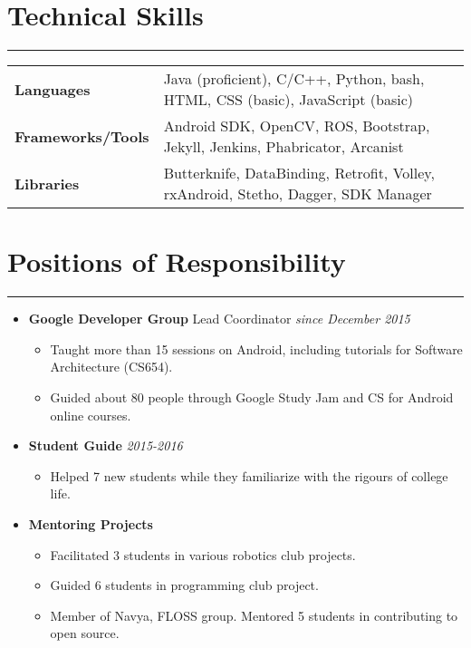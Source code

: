 \documentclass[a4paper]{article}
\begin{document}
\section*{Technical Skills}
\hrule
\vspace{3mm}
\begin{tabular}{@{}m{4.0cm}m{13cm}@{}}
	\textbf{\textrm{Languages}}        & Java (proficient), C/C++, Python, bash, HTML, CSS (basic), JavaScript (basic)      \\ 
	\textbf{\textrm{Frameworks/Tools}} & Android SDK, OpenCV, ROS, Bootstrap, Jekyll, Jenkins, Phabricator, Arcanist        \\
	\textbf{\textrm{Libraries}}        & Butterknife, DataBinding, Retrofit, Volley, rxAndroid, Stetho, Dagger, SDK Manager \\
\end{tabular}

\section*{Positions of Responsibility}
\hrule
\vspace{3mm}
\begin{itemize}
	\item
	      \textbf{Google Developer Group} Lead Coordinator
	      \hfill \textit{since December 2015}
	      \begin{itemize}
	      	\vspace{-2mm} \setlength\itemsep{-0.2em}
		\item Taught more than 15 sessions on Android, including tutorials for Software Architecture (CS654).
		\item Guided about 80 people through Google Study Jam and CS for Android online courses.
	      \end{itemize}
	\item
	      \textbf{Student Guide}
	      \hfill \textit{2015-2016}
	      \begin{itemize}
	      	\vspace{-2mm} \setlength\itemsep{-0.2em}
		\item Helped 7 new students while they familiarize with the rigours of college life.
	      \end{itemize}
	\item
	      \textbf{Mentoring Projects}
	      \begin{itemize}
	      	\vspace{-2mm} \setlength\itemsep{-0.2em}
	      	\item Facilitated 3 students in various robotics club projects.
	      	\item Guided 6 students in programming club project.
	      	\item Member of Navya, FLOSS group. Mentored 5 students in contributing to open source.
	      \end{itemize}
\end{itemize}
\end{document}
